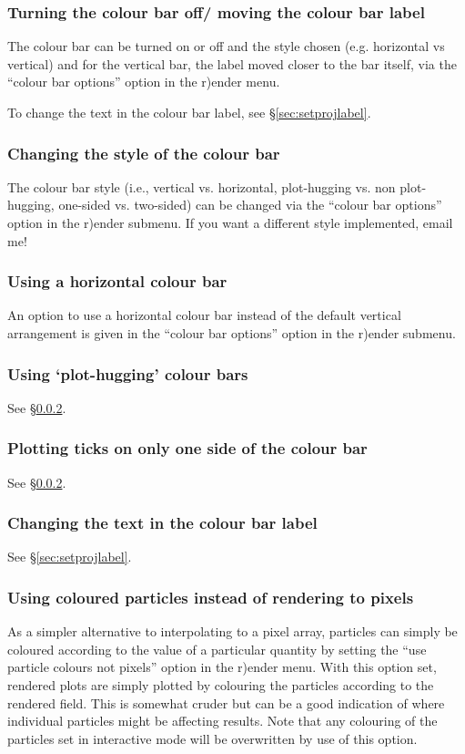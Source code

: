 \documentclass[a4paper,10pt]{article}
\begin{document}
\subsubsection{ Turning the colour bar off/ moving the colour bar label}
 The colour bar can be turned on or off and the style chosen (e.g. horizontal vs vertical) and for the vertical bar, the label moved closer to the bar itself, via the ``colour bar options'' option in the r)ender menu.
 
 To change the text in the colour bar label, see \S\ref{sec:setprojlabel}.

\subsubsection{ Changing the style of the colour bar}
\label{sec:colourbarstyle}
 The colour bar style (i.e., vertical vs. horizontal, plot-hugging vs. non plot-hugging, one-sided vs. two-sided) can be changed via the ``colour bar options'' option in the r)ender submenu. If you want a different style implemented, email me!

\subsubsection{ Using a horizontal colour bar}
 An option to use a horizontal colour bar instead of the default vertical arrangement is given in the ``colour bar options'' option in the r)ender submenu.

\subsubsection{ Using `plot-hugging' colour bars}
 See \S\ref{sec:colourbarstyle}.

\subsubsection{ Plotting ticks on only one side of the colour bar}
 See \S\ref{sec:colourbarstyle}.

\subsubsection{ Changing the text in the colour bar label}
See \S\ref{sec:setprojlabel}.

\subsubsection{ Using coloured particles instead of rendering to pixels}
\label{sec:colournotrender}
 As a simpler alternative to interpolating to a pixel array, particles can simply be coloured according to the value of a particular quantity by setting the ``use particle colours not pixels'' option in the r)ender menu. With this option set, rendered plots are simply plotted by colouring the particles according to the rendered field. This is somewhat
cruder but can be a good indication of where individual particles might be affecting results.
Note that any colouring of the particles set in interactive mode will be overwritten by use of this option.
\end{document}
